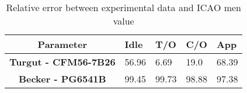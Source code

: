 \begin{table}[h!]
  \centering
  \begin{tabularx}{\textwidth}{||c|X|X|X|X||}
  \hline
    \cellcolor{gray!20}\textbf{Parameter} & \cellcolor{gray!20}\textbf{Idle} & \cellcolor{gray!20}\textbf{T/O} & \cellcolor{gray!20}\textbf{C/O} & \cellcolor{gray!20}\textbf{App} \\ [0.5ex]
  \hline\hline
\centering
    \cellcolor{gray!20}\textbf{Turgut - CFM56-7B26} & 56.96 & 6.69 & 19.0 & 68.39 \\
  \hline
    \cellcolor{gray!20}\textbf{Becker - PG6541B} & 99.45 & 99.73 & 98.88 & 97.38 \\
  \hline
  \end{tabularx}
  \caption{Relative error between experimental data and ICAO men value}
  \label{tab:relee}
\end{table}

